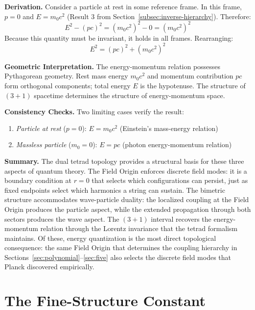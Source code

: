 \documentclass[aps,prd,preprint,superscriptaddress,showpacs,preprintnumbers,amsmath,amssymb,nofootinbib]{revtex4-2}
\begin{document}
\textbf{Derivation.}
Consider a particle at rest in some reference frame. In this frame, $p = 0$ and $E = m_0 c^2$ (Result 3 from Section~\ref{subsec:inverse-hierarchy}). Therefore:
\begin{equation}
E^2 - (pc)^2 = (m_0 c^2)^2 - 0 = (m_0 c^2)^2
\end{equation}
Because this quantity must be invariant, it holds in all frames. Rearranging:
\begin{equation}
E^2 = (pc)^2 + (m_0 c^2)^2
\end{equation}

\textbf{Geometric Interpretation.}
The energy-momentum relation possesses Pythagorean geometry. Rest mass energy $m_0 c^2$ and momentum contribution $pc$ form orthogonal components; total energy $E$ is the hypotenuse. The structure of $(3+1)$ spacetime determines the structure of energy-momentum space.

\textbf{Consistency Checks.}
Two limiting cases verify the result:
\begin{enumerate}
    \item \emph{Particle at rest} ($p = 0$): $E = m_0 c^2$ (Einstein's mass-energy relation)
    \item \emph{Massless particle} ($m_0 = 0$): $E = pc$ (photon energy-momentum relation)
\end{enumerate}

\textbf{Summary.}
The dual tetrad topology provides a structural basis for these three aspects of quantum theory. The Field Origin enforces discrete field modes: it is a boundary condition at $r = 0$ that selects which configurations can persist, just as fixed endpoints select which harmonics a string can sustain. The bimetric structure accommodates wave-particle duality: the localized coupling at the Field Origin produces the particle aspect, while the extended propagation through both sectors produces the wave aspect. The $(3{+}1)$ interval recovers the energy-momentum relation through the Lorentz invariance that the tetrad formalism maintains. Of these, energy quantization is the most direct topological consequence: the same Field Origin that determines the coupling hierarchy in Sections~\ref{sec:polynomial}--\ref{sec:five} also selects the discrete field modes that Planck discovered empirically.

\section{The Fine-Structure Constant}
\label{sec:alpha}
\end{document}
